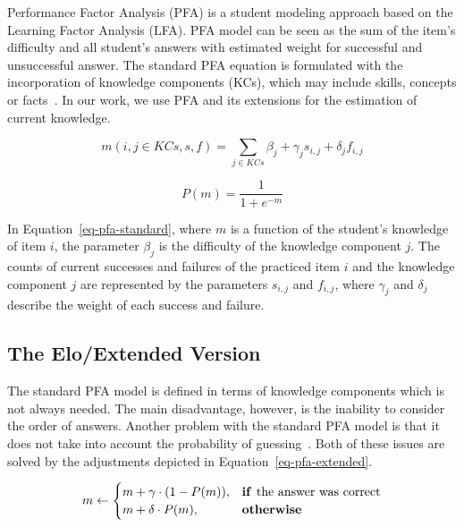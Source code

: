 Performance Factor Analysis (PFA) is a student modeling approach based on the Learning Factor Analysis (LFA). PFA model can be seen as the sum of the item's difficulty and all student's answers with estimated weight for successful and unsuccessful answer. The standard PFA equation is formulated with the incorporation of knowledge components (KCs), which may include skills, concepts or facts~\cite{Pavlik2009}. In our work, we use PFA and its extensions for the estimation of current knowledge.

\begin{equation} \label{eq-pfa-standard}
  m(i,j \in KCs,s,f) = \sum_{j \in KCs} \beta_j + \gamma_j s_{i,j} + \delta_j f_{i,j} 
\end{equation}

\begin{equation} \label{eq-pfa-standard-p}
  P(m) = \frac{1}{1 + e^{-m}}
\end{equation}

In Equation~\ref{eq-pfa-standard}, where $m$ is a function of the student's knowledge of item $i$, the parameter $\beta_j$ is the difficulty of the knowledge component $j$. The counts of current successes and failures of the practiced item $i$ and the knowledge component $j$ are represented by the parameters $s_{i,j}$ and $f_{i,j}$, where $\gamma_j$ and $\delta_j$ describe the weight of each success and failure.

\subsection*{The Elo/Extended Version}
\label{pfae}

The standard PFA model is defined in terms of knowledge components which is not always needed. The main disadvantage, however, is the inability to consider the order of answers. Another problem with the standard PFA model is that it does not take into account the probability of guessing~\cite{Papousek2014}. Both of these issues are solved by the adjustments depicted in Equation~\ref{eq-pfa-extended}.

\begin{equation} \label{eq-pfa-extended}
  m \gets \begin{cases}
            m + \gamma \cdot (1 - P(m)), & \text{\textbf{if }} \text{the answer was correct} \\
            m + \delta \cdot P(m), & \text{\textbf{otherwise}}
          \end{cases}
\end{equation}

